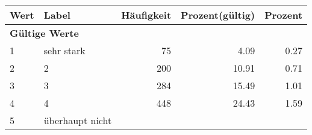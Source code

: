      \begin{longtable}{lXrrr}
     \toprule
     \textbf{Wert} & \textbf{Label} & \textbf{Häufigkeit} & \textbf{Prozent(gültig)} & \textbf{Prozent} \\
     \endhead
     \midrule
     \multicolumn{5}{l}{\textbf{Gültige Werte}}\\

     1 &
     \multicolumn{1}{X}{ sehr stark   } &


       \num{75} &
       \num[round-mode=places,round-precision=2]{4,09} &
         \num[round-mode=places,round-precision=2]{0,27} \\

     2 &
     \multicolumn{1}{X}{ 2   } &


       \num{200} &
       \num[round-mode=places,round-precision=2]{10,91} &
         \num[round-mode=places,round-precision=2]{0,71} \\

     3 &
     \multicolumn{1}{X}{ 3   } &


       \num{284} &
       \num[round-mode=places,round-precision=2]{15,49} &
         \num[round-mode=places,round-precision=2]{1,01} \\

     4 &
     \multicolumn{1}{X}{ 4   } &


       \num{448} &
       \num[round-mode=places,round-precision=2]{24,43} &
         \num[round-mode=places,round-precision=2]{1,59} \\

     5 &
     \multicolumn{1}{X}{ überhaupt nicht   } &



\end{longtable}
